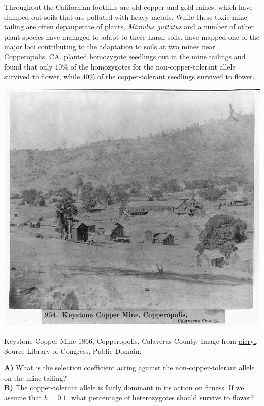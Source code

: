 \begin{question}
Throughout the Californian foothills are old copper and gold-mines, which have dumped out soils that are polluted with heavy metals. While these toxic mine tailing are often depauperate of plants,  {\it Mimulus guttatus} and a number of other plant species have managed to adapt to these harsh soils. \citet{wright2015adaptation} have mapped one of the major loci contributing to the adaptation to soils at two mines near Copperopolis, CA. \citeauthor{wright2015adaptation} planted homozygote seedlings out in the mine tailings and found that only $10\%$ of the homozygotes for the non-copper-tolerant allele survived to flower, while $40\%$ of the copper-tolerant seedlings survived to flower.\\

\begin{marginfigure}
\begin{center}
\includegraphics[width = 1.2 \textwidth]{illustration_images/single_locus_selection/Copperopolis/KeystoneCopperMineCopperopolisCalaverasCounty.jpg}
\end{center}
\caption{Keystone Copper Mine 1866, Copperopolis, Calaveras
  County. \newline \noindent \tiny{ Image from
  \href{https://picryl.com/media/keystone-copper-mine-copperopolis-calaveras-county}{picryl}.
Source Library of Congress, Public Domain. }}
  \label{fig:Copperopolis}
\end{marginfigure}

{\bf A)} What is the selection coefficient acting against the non-copper-tolerant allele on the mine tailing?\\
{\bf B)} The copper-tolerant allele is fairly dominant in its action on fitness. If we assume that $h=0.1$, what percentage of heterozygotes should survive to flower?
\end{question}
